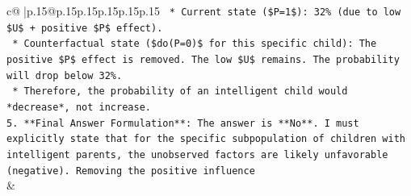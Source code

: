 \documentclass{article}
\begin{document}
{\begin{supertabular}{c@{$\;$}|p{.15\linewidth}@{}p{.15\linewidth}p{.15\linewidth}p{.15\linewidth}p{.15\linewidth}p{.15\linewidth}}
{{{\texttt{    *   Current state (\$P=1\$): 32\% (due to low \$U\$ + positive \$P\$ effect).} \\
\texttt{    *   Counterfactual state (\$do(P=0)\$ for this specific child): The positive \$P\$ effect is removed. The low \$U\$ remains. The probability will drop below 32\%.} \\
\texttt{    *   Therefore, the probability of an intelligent child would *decrease*, not increase.} \\
\texttt{5.  **Final Answer Formulation**: The answer is **No**. I must explicitly state that for the specific subpopulation of children with intelligent parents, the unobserved factors are likely unfavorable (negative). Removing the positive influence} \\
            }
        }
    }
    & \\ \\

\end{supertabular}
}
\end{document}

